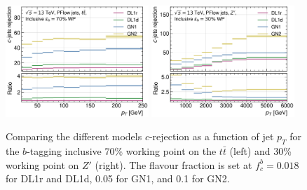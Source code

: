 \begin{figure}[h!]
  \centering
  \includegraphics[width=0.48\textwidth]{Images/FTAG/GN/GN2/pt_plots/pt_ttbar_c_rej.png}
  \includegraphics[width=0.48\textwidth]{Images/FTAG/GN/GN2/pt_plots/pt_zp_c_rej.png}
  \caption{Comparing the different models $c$-rejection as a function of jet $p_T$ for the $b$-tagging inclusive 70\% working point on the $t\bar{t}$ (left) and 30\% working point on $Z'$ (right). The flavour fraction is set at $f^b_c = 0.018$ for DL1r and DL1d, 0.05 for GN1, and 0.1 for GN2.}
  \label{apfig:GNxptb_crej}
\end{figure} 

\clearpage

